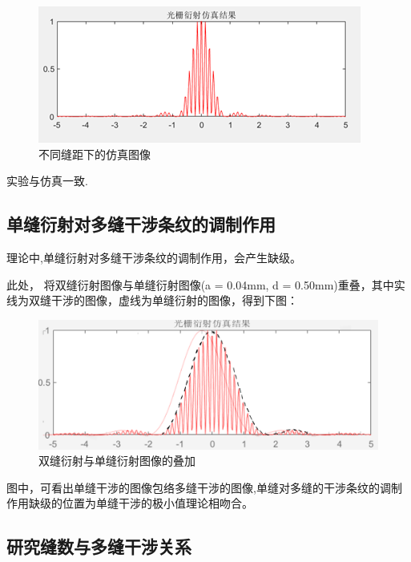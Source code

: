 \documentclass[a4paper]{../phyreport}
\begin{document}
\begin{figure}[H]
  \begin{minipage}[b]{0.45\linewidth}
    \centering
    \includegraphics[width=0.9\linewidth]{fig/仿真/0.080.50.png}
  \end{minipage}
  \caption{不同缝距下的仿真图像}
\end{figure}
实验与仿真一致.

\subsection{单缝衍射对多缝干涉条纹的调制作用}
理论中,单缝衍射对多缝干涉条纹的调制作用，会产生缺级。

此处，
将双缝衍射图像与单缝衍射图像(a = 0.04mm,  d = 0.50mm)重叠，其中实线为双缝干涉的图像，虚线为单缝衍射的图像，得到下图：
\begin{figure}[H]
  \centering
  \includegraphics[width=0.6\linewidth]{fig/仿真/组合.png}
  \caption{双缝衍射与单缝衍射图像的叠加}
\end{figure}

图中，可看出单缝干涉的图像包络多缝干涉的图像,单缝对多缝的干涉条纹的调制作用缺级的位置为单缝干涉的极小值理论相吻合。

\subsection{研究缝数与多缝干涉关系}
\end{document}
